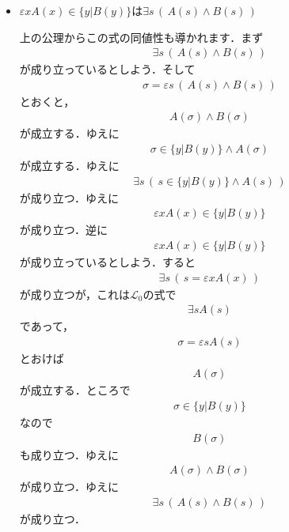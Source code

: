 \begin{itemize}
		\item $\varepsilon x A(x) \in \{y|B(y)\}$は$\exists s\, \left(\, A(s) \wedge B(s)\, \right)$
			
			上の公理からこの式の同値性も導かれます．まず
			\begin{align}
				\exists s\, \left(\, A(s) \wedge B(s)\, \right)
			\end{align}
			が成り立っているとしよう．そして
			\begin{align}
				\sigma = \varepsilon s\, \left(\, A(s) \wedge B(s)\, \right)
			\end{align}
			とおくと，
			\begin{align}
				A(\sigma) \wedge B(\sigma)
			\end{align}
			が成立する．ゆえに
			\begin{align}
				\sigma \in \{y|B(y)\} \wedge A(\sigma)
			\end{align}
			が成立する．ゆえに
			\begin{align}
				\exists s\, \left(\, s \in \{y|B(y)\} \wedge A(s)\, \right)
			\end{align}
			が成り立つ．ゆえに
			\begin{align}
				\varepsilon x A(x) \in \{y|B(y)\}
			\end{align}
			が成り立つ．逆に
			\begin{align}
				\varepsilon x A(x) \in \{y|B(y)\}
			\end{align}
			が成り立っているとしよう．すると
			\begin{align}
				\exists s\, \left(\, s = \varepsilon x A(x)\, \right)
			\end{align}
			が成り立つが，これは$\mathcal{L}_{0}$の式で
			\begin{align}
				\exists s A(s)
			\end{align}
			であって，
			\begin{align}
				\sigma = \varepsilon s A(s)
			\end{align}
			とおけば
			\begin{align}
				A(\sigma)
			\end{align}
			が成立する．ところで
			\begin{align}
				\sigma \in \{y|B(y)\}
			\end{align}
			なので
			\begin{align}
				B(\sigma)
			\end{align}
			も成り立つ．ゆえに
			\begin{align}
				A(\sigma) \wedge B(\sigma)
			\end{align}
			が成り立つ．ゆえに
			\begin{align}
				\exists s\, \left(\, A(s) \wedge B(s)\, \right)
			\end{align}
			が成り立つ．
			

\end{itemize}
